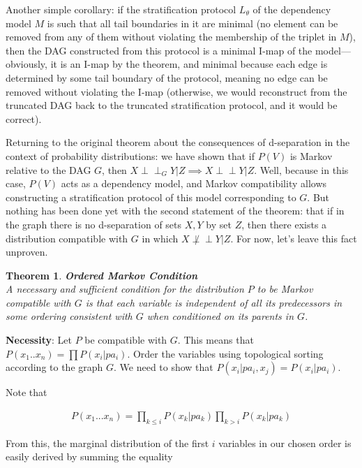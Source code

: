 \documentclass[fleqn]{article}
\newcommand{\independent}{\perp \!\!\! \perp}
\newcommand{\indepg}{\perp \!\!\! \perp_G}
\newtheorem{theorem}{Theorem}
\numberwithin{equation}{section}
\numberwithin{theorem}{section}
\numberwithin{figure}{section}
\numberwithin{lemma}{section}
\numberwithin{corollary}{section}
\begin{document}
Another simple corollary: if the stratification protocol \( L_\theta \) of the dependency model \( M \) is such that all tail boundaries in it are minimal (no element can be removed from any of them without violating the membership of the triplet in \( M \)), then the DAG constructed from this protocol is a minimal I-map of the model—obviously, it is an I-map by the theorem, and minimal because each edge is determined by some tail boundary of the protocol, meaning no edge can be removed without violating the I-map (otherwise, we would reconstruct from the truncated DAG back to the truncated stratification protocol, and it would be correct).

Returning to the original theorem about the consequences of d-separation in the context of probability distributions: we have shown that if \( P(V) \) is Markov relative to the DAG \( G \), then \( X \indepg Y | Z \implies X \independent Y | Z \). Well, because in this case, \( P(V) \) acts as a dependency model, and Markov compatibility allows constructing a stratification protocol of this model corresponding to \( G \). But nothing has been done yet with the second statement of the theorem: that if in the graph there is no d-separation of sets \( X, Y \) by set \( Z \), then there exists a distribution compatible with \( G \) in which \( X \not\independent Y | Z \). For now, let's leave this fact unproven.

\begin{theorem} \textbf{Ordered Markov Condition}\\
	A necessary and sufficient condition for the distribution \( P \) to be Markov compatible with \( G \) is that each variable is independent of all its predecessors in some ordering consistent with \( G \) when conditioned on its parents in \( G \).
	\label{th:ordered_markov}
\end{theorem}

\textbf{Necessity}: Let \( P \) be compatible with \( G \). This means that \( P(x_1..x_n) = \prod P(x_i|pa_i) \). Order the variables using topological sorting according to the graph \( G \). We need to show that \( P(x_i | pa_i, x_j) = P(x_i | pa_i) \).

Note that

\begin{align}
	P(x_1...x_n) = \prod\limits_{k\le i}P(x_k|pa_k)\prod\limits_{k> i} P(x_k | pa_k)
	\label{eq:factorization1}
\end{align}

From this, the marginal distribution of the first \( i \) variables in our chosen order is easily derived by summing the equality
\end{document}
